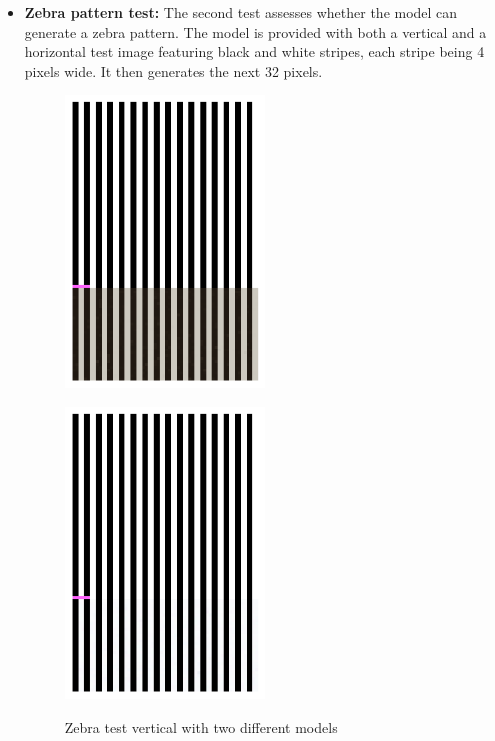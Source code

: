 \begin{itemize}
        \item \textbf{Zebra pattern test:} The second test assesses whether the model can generate a zebra pattern. The model is provided with both a vertical and a horizontal test image featuring black and white stripes, each stripe being 4 pixels wide. It then generates the next 32 pixels.

        \begin{figure}[H]
            \centering
            \begin{minipage}{0.45\textwidth}
                \centering
                \includegraphics[width=0.5\textwidth]{imgs/ZebraTestV_2.1.7.1_OldData.png} 
                \label{fig:test2_0_M0_Cit}
            \end{minipage}
            \hfill
            \begin{minipage}{0.45\textwidth}
                \centering
                \includegraphics[width=0.5\textwidth]{imgs/ZebraTestV_2.1.8.1_512.png} 
                \label{fig:test2_0_M5_Cit}
            \end{minipage}
            \caption{Zebra test vertical with two different models}
        \end{figure}


\end{itemize}
